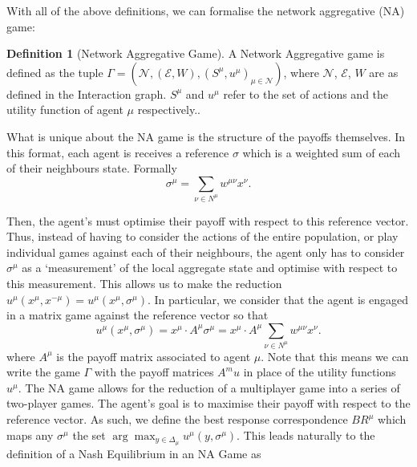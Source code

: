 \documentclass{article}
\theoremstyle{definition}
\newtheorem*{definition}{Definition}
\newcommand{\agentset}{\mathcal{N}}
\newcommand{\edgeset}{\mathcal{E}}
\newcommand{\weightset}{W}
\newcommand{\actionset}[1]{S^{#1}}
\newcommand{\utility}[1]{u^{#1}}
\newcommand{\wmunu}{w^{\mu \nu}}
\newcommand{\xmu}{x^{\mu}}
\newcommand{\xnu}{x^{\nu}}
\newcommand{\refmu}{\sigma^{\mu}}
\newcommand{\weightedsum}{ \sum_{\nu \in N^\mu} \wmunu \xnu}
\newcommand{\xnotmu}{x^{-\mu}}
\begin{document}
	With all of the above definitions, we can formalise the
        network aggregative (NA) game:
	
	\begin{definition}[Network Aggregative Game]
		A Network Aggregative game is defined as the tuple $\Gamma =
        (\agentset, (\edgeset, \weightset), (\actionset{\mu},
        \utility{\mu})_{\mu \in \mathcal{N}})$, where $\agentset$, $\edgeset$, $\weightset$ are as
        defined in the Interaction graph. $\actionset{\mu}$ and $\utility{\mu}$ refer to the set of
        actions and the utility function of agent $\mu$ respectively..
	\end{definition}


	What is unique about the NA game is the structure of the
        payoffs themselves. In this format, each agent is receives a
        reference $\sigma$ which is a weighted sum of each of their
        neighbours state. Formally
%
	\begin{equation}
		\sigma^\mu = \sum_{\nu \in N^\mu} \wmunu \xnu.
	\end{equation}

	Then, the agent's must optimise their payoff with respect to
        this reference vector. Thus, instead of having to consider the
        actions of the entire population, or play individual games
        against each of their neighbours, the agent only has to
        consider $\sigma^\mu$ as a `measurement' of the local
        aggregate state and optimise with respect to this
        measurement. This allows us to make the reduction $u^\mu(\xmu,
        \xnotmu) = u^\mu(\xmu, \refmu)$. In particular, we consider
        that the agent is engaged in a matrix game against the
        reference vector so that
%
	\begin{equation}
		u^\mu(\xmu, \refmu) = \xmu \cdot A^\mu \refmu = \xmu
                \cdot A^\mu \weightedsum.
	\end{equation}
	where $A^\mu$ is the payoff matrix associated to agent
        $\mu$. Note that this means we can write the game
        $\Gamma$ with the payoff matrices $A^mu$ in place of the
        utility functions $\utility{\mu}$. The NA game allows for the
        reduction of a multiplayer game into a series of two-player
        games. The agent's goal is to maximise their payoff with
        respect to the reference vector. As such, we define the best
        response correspondence $BR^\mu$ which maps any $\refmu$ the
        set $\arg \max_{y \in \Delta_\mu} {u^\mu(y, \refmu)}$. This
        leads naturally to the definition of a Nash Equilibrium in an
        NA Game as
\end{document}
